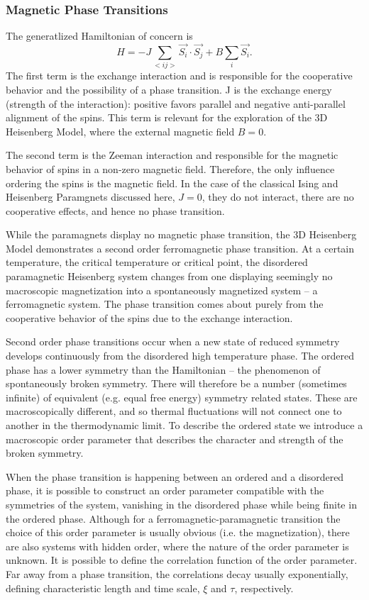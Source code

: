 \documentclass[a4paper,12pt]{article}
\begin{document}
	\subsubsection{Magnetic Phase Transitions}
	The generatlized Hamiltonian of concern is
	\begin{equation}\label{eq:full_hamiltonian}
			H = -J\sum_{<ij>}\vec{S_i}\cdot\vec{S_j} + B\sum_i{\vec{S_i}}.
		\end{equation}
The first term is the exchange interaction and is responsible for the cooperative behavior and the possibility of a phase transition. J is the exchange energy (strength of the interaction): positive favors parallel and negative anti-parallel alignment of the spins. This term is relevant for the exploration of the 3D Heisenberg Model, where the external magnetic field $B = 0$.

The second term is the Zeeman interaction and responsible for the magnetic behavior of spins in a non-zero magnetic field. Therefore, the only influence ordering the spins is the magnetic field. In the case of the classical Ising and Heisenberg Paramgnets discussed here, $J = 0$, they do not interact, there are no cooperative effects, and hence no phase transition.

While the paramagnets display no magnetic phase transition, the 3D Heisenberg Model demonstrates a second order ferromagnetic phase transition. At a certain temperature, the critical temperature or critical point, the disordered paramagnetic Heisenberg system changes from one displaying seemingly no macroscopic magnetization into a spontaneously magnetized system -- a ferromagnetic system. The phase transition comes about purely from the cooperative behavior of the spins due to the exchange interaction.

Second order phase transitions occur when a new state of reduced symmetry develops continuously from the disordered high temperature phase. The ordered phase has a lower symmetry than the Hamiltonian -- the phenomenon of spontaneously broken symmetry. There will therefore be a number (sometimes infinite) of equivalent (e.g. equal free energy) symmetry related states. These are macroscopically different, and so thermal ﬂuctuations will not connect one to another in the thermodynamic limit. To describe the ordered state we introduce a macroscopic order parameter that describes the character and strength of the broken symmetry.

When the phase transition is happening between an ordered and a disordered phase, it is possible to construct an order parameter compatible with the symmetries of the system, vanishing in the disordered phase while being finite in the ordered phase. Although for a ferromagnetic-paramagnetic transition the choice of this order parameter is usually obvious (i.e. the magnetization), there are also systems with hidden order, where the nature of the order parameter is unknown. It is possible to define the correlation function of the order parameter. Far away from a phase transition, the correlations decay usually exponentially, defining characteristic length and time scale, $\xi$ and $\tau$, respectively. \cite{landau, newman}
\end{document}
